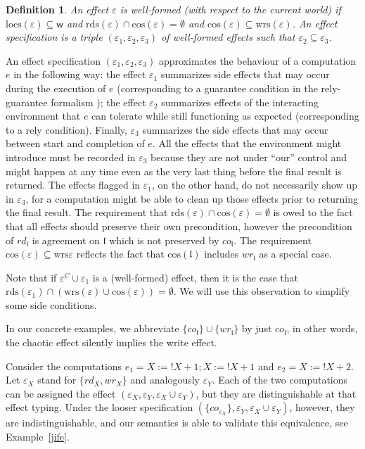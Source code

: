 \documentclass[nocopyrightspace,preprint]{sigplanconf}
\newcommand{\myread}[1]{!{#1}}
\newcommand{\assign}[2]{{#1}:={#2}}
\newcommand{\rdsin}[1]{\mathrm{rds}({#1})}
\newcommand{\wrsin}[1]{\mathrm{wrs}({#1})}
\newcommand{\eff}{\varepsilon}
\newcommand{\writes}{\mathrm{wrs}}
\newcommand{\wrs}{\writes}
\newcommand{\concs}[1]{\mathrm{cos}(#1)}
\newcommand{\locs}[1]{\mathrm{locs}(#1)}
\newcommand{\rEff}[1]{\ensuremath{\mathit{rd}_{#1}}}
\newcommand{\cEff}[1]{\ensuremath{\mathit{co}_{#1}}}
\newcommand{\wEff}[1]{\ensuremath{\mathit{wr}_{#1}}}
\newtheorem{definition}[theorem]{Definition}
\newcommand{\loc}{\mathfrak{l}}
\newcommand\w{\ensuremath{\mathsf{w}}\xspace}
\begin{document}
\begin{definition}
An effect $\eff$ is well-formed (with respect to the current world) if  $\locs\eff\subseteq\w$ and $\rdsin\eff\cap\concs\eff=\emptyset$ and $\concs\eff\subseteq\wrsin\eff$. 
An effect specification is a triple $(\eff_1,\eff_2,\eff_3)$ of well-formed effects such that $\eff_2\subseteq\eff_3$. 
\end{definition}
An effect specification $(\eff_1,\eff_2,\eff_3)$ approximates the
behaviour of a computation $e$ in the following way: the effect
$\eff_1$ summarizes side effects that may occur during the execution
of $e$ (corresponding to a guarantee condition in the rely-guarantee
formalism \cite{DBLP:journals/logcom/ColemanJ07}); the effect $\eff_2$ summarizes effects of the interacting
environment that $e$ can tolerate while still functioning as expected
(corresponding to a rely condition). Finally, $\eff_3$
summarizes the side effects that may occur between start and completion of $e$. All the effects that the
environment might introduce must be recorded in $\eff_3$ because they are
not under ``our'' control and might happen at any time even as the
very last thing before the final result is returned. The effects
flagged in $\eff_1$, on the other hand, do not necessarily show up in
$\eff_3$, for a computation might be able to clean up those effects
prior to returning the final result. The requirement that $\rdsin{\eff}\cap \concs{\eff}=\emptyset$ is owed to the fact that all effects should preserve their own precondition, however the precondition of $\rEff{\loc}$ is agreement on $\loc$ which is not preserved by $\cEff{\loc}$. The requirement $\concs{\eff}\subseteq\wrs{\eff}$ reflects the fact that $\concs{\loc}$ includes $\wEff{\loc}$ as a special case. 

Note that if $\eff^C \cup \eff_1$ is a (well-formed) effect, then it
is the case that $\rdsin{\eff_1} \cap (\wrsin{\eff} \cup \concs{\eff})
= \emptyset$. We will use this observation to simplify some side
conditions.

In our concrete examples, we abbreviate $\{\cEff{\loc}\}\cup\{\wEff{\loc}\}$ by just $\cEff{\loc}$, in other words, the chaotic effect silently implies the write effect.

Consider the computations $e_1 =
\assign{X}{\myread{X}+1};\assign{X}{\myread{X}+1}$ and $e_2 =
\assign{X}{\myread{X}+2}$.  Let $\eff_X$ stand for
$\{\rEff{X},\wEff{X}\}$ and analogously $\eff_Y$.  Each of the two
computations can be assigned the effect $(\eff_X,\eff_Y,\eff_X\cup
\eff_Y)$, but they are distinguishable at that effect typing. Under
the looser specification $(\{\cEff{\eff_X}\},\eff_Y,\eff_X\cup
\eff_Y)$, however, they are indistinguishable, and our semantics is
able to validate this equivalence, see Example~\ref{jife}.
\end{document}
